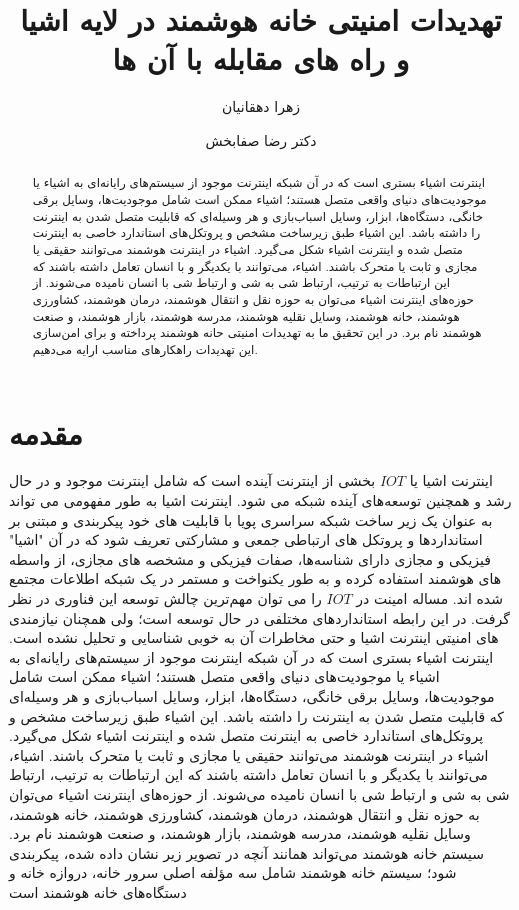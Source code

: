 \documentclass[aimcpersian]{aimc46}
\title{تهدیدات امنیتی خانه هوشمند در لایه اشیا و راه های مقابله با آن ها}
\author{
زهرا دهقانیان%
\RTLthanks{ارایه دهنده}\index{دهقانیان، زهرا}
\university{دانشجوی نرم افزار دانشگاه امیرکبیر}
\and
دکتر رضا صفابخش
\index{صفابخش،رضا}\university{استاد دانشگاه امیرکبیر}
}
\begin{document}
\pagestyle{plain}
\maketitle

\begin{abstract}
  اینترنت اشیاء بستری است که در آن شبکه اینترنت موجود از سیستم‌های رایانه‌ای به اشیاء یا موجودیت‌های دنیای واقعی متصل هستند؛ اشیاء ممکن است شامل موجودیت‌ها، وسایل برقی خانگی، دستگاه‌ها، ابزار، وسایل اسباب‌بازی و هر وسیله‌ای که قابلیت متصل شدن به اینترنت را داشته باشد. این اشیاء طبق زیرساخت مشخص و پروتکل‌های استاندارد خاصی به اینترنت متصل شده و اینترنت اشیاء شکل می‌گیرد. اشیاء در اینترنت هوشمند می‌توانند حقیقی یا مجازی و ثابت یا متحرک باشند. اشیاء، می‌توانند با یکدیگر و با انسان تعامل داشته باشند که این ارتباطات به ترتیب، ارتباط شی به شی و ارتباط شی با انسان نامیده می‌شوند. از حوزه‌های اینترنت اشیاء می‌توان به حوزه‌ نقل ‌و انتقال هوشمند، درمان هوشمند، کشاورزی هوشمند، خانه هوشمند، وسایل نقلیه هوشمند، مدرسه هوشمند، بازار هوشمند، و صنعت هوشمند نام برد. در این تحقیق ما به تهدیدات امنیتی حانه هوشمند پرداخته و برای امن‌سازی این تهدیدات راهکارهای مناسب ارایه می‌دهیم.
\end{abstract}


\section{مقدمه }
    اینترنت اشیا یا $IOT$ بخشی از اینترنت آینده است که شامل اینترنت موجود و در حال رشد و همچنین توسعه‌های آینده شبکه می شود. اینترنت اشیا به طور مفهومی می تواند به عنوان یک زیر ساخت شبکه سراسری پویا با قابلیت های خود پیکربندی و مبتنی بر استانداردها و پروتکل های ارتباطی جمعی و مشارکتی تعریف شود که در آن "اشیا" فیزیکی و مجازی دارای شناسه‌ها، صفات فیزیکی و مشخصه های مجازی، از واسطه های هوشمند استفاده کرده و به طور یکنواخت و مستمر در یک شبکه اطلاعات مجتمع شده اند. مساله امینت در $IOT$ را می ‌توان مهم‌ترین چالش توسعه این فناوری در نظر گرفت. در این رابطه استانداردهای مختلفی در حال توسعه است؛ ولی همچنان نیازمندی های امنیتی اینترنت اشیا و حتی مخاطرات آن به خوبی شناسایی و تحلیل نشده است.   اینترنت اشیاء بستری است که در آن شبکه اینترنت موجود از سیستم‌های رایانه‌ای به اشیاء یا موجودیت‌های دنیای واقعی متصل هستند؛ اشیاء ممکن است شامل موجودیت‌ها، وسایل برقی خانگی، دستگاه‌ها، ابزار، وسایل اسباب‌بازی و هر وسیله‌ای که قابلیت متصل شدن به اینترنت را داشته باشد. این اشیاء طبق زیرساخت مشخص و پروتکل‌های استاندارد خاصی به اینترنت متصل شده و اینترنت اشیاء شکل می‌گیرد. اشیاء در اینترنت هوشمند می‌توانند حقیقی یا مجازی و ثابت یا متحرک باشند. اشیاء، می‌توانند با یکدیگر و با انسان تعامل داشته باشند که این ارتباطات به ترتیب، ارتباط شی به شی و ارتباط شی با انسان نامیده می‌شوند. از حوزه‌های اینترنت اشیاء می‌توان به حوزه‌ نقل ‌و انتقال هوشمند، درمان هوشمند، کشاورزی هوشمند، خانه هوشمند، وسایل نقلیه هوشمند، مدرسه هوشمند، بازار هوشمند، و صنعت هوشمند نام برد. سیستم خانه هوشمند می‌تواند همانند آنچه در تصویر زیر نشان داده شده، پیکربندی شود؛ سیستم خانه هوشمند شامل سه مؤلفه اصلی سرور خانه، دروازه خانه و دستگاه‌های خانه هوشمند است
\end{document}
